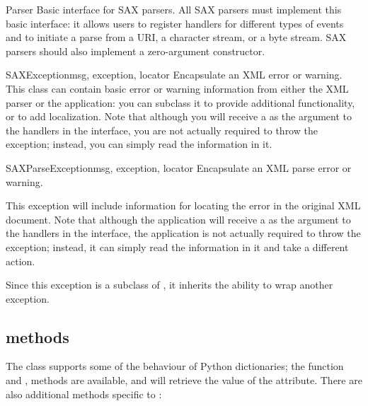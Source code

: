 \documentclass{howto}
\newcommand{\attribute}[1]{\code{#1}}
\begin{document}
\begin{classdesc}{Parser}{}
Basic interface for SAX parsers. All SAX
    parsers must implement this basic interface: it allows users to
    register handlers for different types of events and to initiate a
    parse from a URI, a character stream, or a byte stream. SAX
    parsers should also implement a zero-argument constructor.
\end{classdesc}


\begin{classdesc}{SAXException}{msg, exception, locator}
Encapsulate an XML error or warning. This class can contain
    basic error or warning information from either the XML parser or
    the application: you can subclass it to provide additional
    functionality, or to add localization. Note that although you will
    receive a  as the argument to the handlers in the
     interface, you are not actually required to throw
    the exception; instead, you can simply read the information in
    it.
\end{classdesc}

\begin{classdesc}{SAXParseException}{msg, exception, locator}
Encapsulate an XML parse error or warning.
    
This exception will include information for locating the error in the
    original XML document. Note that although the application will
    receive a  as the argument to the
    handlers in the  interface, the application is not
    actually required to throw the exception; instead, it can simply
    read the information in it and take a different action.

Since this exception is a subclass of , it inherits
    the ability to wrap another exception.
\end{classdesc}


\subsection{ methods}

The  class supports some of the behaviour of
Python dictionaries; the  function and ,
 methods are available, and  will
retrieve the value of the \attribute{href} attribute.  There are also
additional methods specific to :
\end{document}
